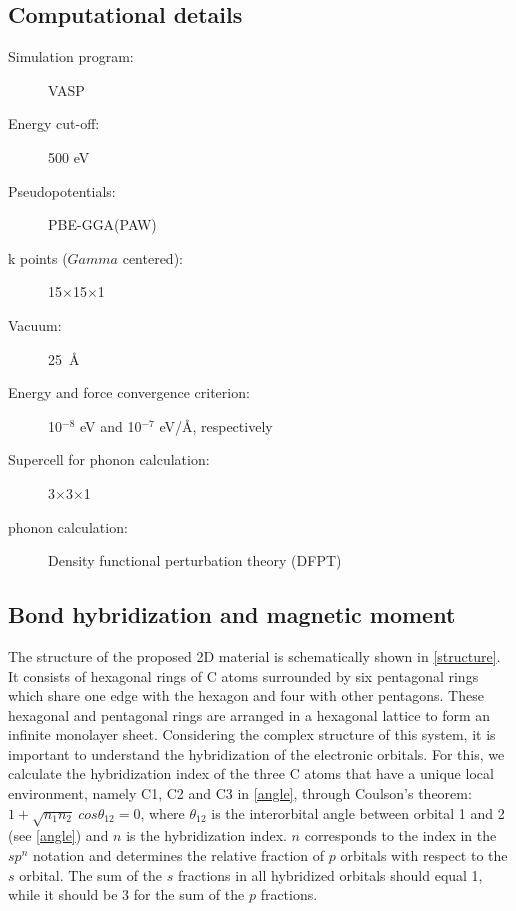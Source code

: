 \subsection{Computational details}
\begin{footnotesize}
\begin{description}
\item[Simulation program:] VASP
\item[Energy cut-off:] 500 eV
\item[Pseudopotentials:] PBE-GGA(PAW)
\item[k points ($Gamma$ centered):] 15$\times$15$\times$1
\item[Vacuum:] 25~\AA
\item[Energy and force convergence criterion:] 10$^{-8}$ eV and 10$^{-7}$ eV/\AA, respectively
\item[Supercell for phonon calculation:] 3$\times$3$\times$1
\item[phonon calculation:] Density functional perturbation theory (DFPT)
\end{description}
\end{footnotesize}

\subsection{Bond hybridization and magnetic moment \label{res}}

The structure of the proposed 2D material is schematically shown in \autoref{structure}. It consists of hexagonal rings of C atoms surrounded by six pentagonal rings which share one edge with the hexagon and four with other pentagons. These hexagonal and pentagonal rings are arranged in a hexagonal lattice to form an infinite monolayer sheet. Considering the complex structure of this system, it is important to understand the hybridization of the electronic orbitals. For this, we calculate the hybridization index of the three C atoms that have a unique local environment, namely C1, C2 and C3 in \autoref{angle}, through Coulson's theorem: $1+\sqrt{n_1n_2}~cos\theta_{12}=0$, where $\theta_{12}$ is the interorbital angle between orbital 1 and 2 (see \autoref{angle}) and $n$ is the hybridization index.  $n$ corresponds to the index in the $sp^n$ notation and determines the relative fraction of $p$ orbitals with respect to the $s$ orbital. The sum of the $s$ fractions in all hybridized orbitals should equal 1, while it should be 3 for the sum of the $p$ fractions. 

